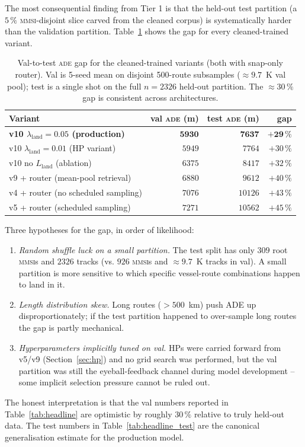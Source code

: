 \documentclass[oneside, a4paper, onecolumn, 11pt]{article}
\newcommand{\ade}{\textsc{ade}}
\begin{document}
The most consequential finding from Tier 1 is that the held-out test
partition (a $5\,\%$ \textsc{mmsi}-disjoint slice carved from the
cleaned corpus) is systematically harder than the validation partition.
Table~\ref{tab:valtest} shows the gap for every cleaned-trained
variant.

\begin{table}[h]
\centering
\caption{Val-to-test \ade{} gap for the cleaned-trained variants
(both with snap-only router).  Val is 5-seed mean on disjoint
500-route subsamples ($\approx 9.7$~K val pool);
test is a single shot on the full $n = 2326$ held-out partition.
The $\approx 30\,\%$ gap is consistent across architectures.}
\label{tab:valtest}
\begin{tabular}{lrrr}
\toprule
\textbf{Variant} & val \ade{} (m) & test \ade{} (m) & gap \\
\midrule
\textbf{v10 $\lambda_{\mathrm{land}} = 0.05$ (production)} & $\mathbf{5930}$ & $\mathbf{7637}$ & $\mathbf{+29\,\%}$ \\
v10 $\lambda_{\mathrm{land}} = 0.01$ (HP variant) & $5949$ & $7764$ & $+30\,\%$ \\
v10 no $L_{\mathrm{land}}$ (ablation) & $6375$ & $8417$ & $+32\,\%$ \\
v9 + router (mean-pool retrieval)     & $6880$ & $9612$ & $+40\,\%$ \\
v4 + router (no scheduled sampling)   & $7076$ & $10126$ & $+43\,\%$ \\
v5 + router (scheduled sampling)      & $7271$ & $10562$ & $+45\,\%$ \\
\bottomrule
\end{tabular}
\end{table}

Three hypotheses for the gap, in order of likelihood:
\begin{enumerate}[leftmargin=*]
  \item \emph{Random shuffle luck on a small partition.}  The test
        split has only $309$ root \textsc{mmsi}s and $2326$ tracks
        (vs. $926$ \textsc{mmsi}s and $\approx 9.7$~K tracks in val).
        A small partition is more sensitive to which specific
        vessel-route combinations happen to land in it.
  \item \emph{Length distribution skew.}  Long routes ($>500$~km)
        push ADE up disproportionately; if the test partition happened
        to over-sample long routes the gap is partly mechanical.
  \item \emph{Hyperparameters implicitly tuned on val.}  HPs were
        carried forward from v5/v9 (Section~\ref{sec:hp}) and no
        grid search was performed, but the val partition was still
        the eyeball-feedback channel during model development -- some
        implicit selection pressure cannot be ruled out.
\end{enumerate}
The honest interpretation is that the val numbers reported in
Table~\ref{tab:headline} are optimistic by roughly $30\,\%$ relative
to truly held-out data.  The test numbers in
Table~\ref{tab:headline_test} are the canonical generalisation
estimate for the production model.
\end{document}
